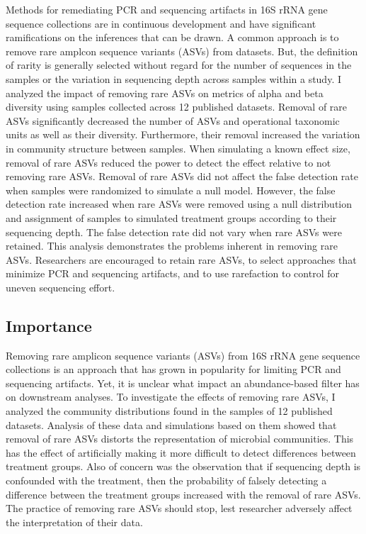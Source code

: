 \documentclass[
]{article}
\begin{document}
Methods for remediating PCR and sequencing artifacts in 16S rRNA gene
sequence collections are in continuous development and have significant
ramifications on the inferences that can be drawn. A common approach is
to remove rare amplcon sequence variants (ASVs) from datasets. But, the
definition of rarity is generally selected without regard for the number
of sequences in the samples or the variation in sequencing depth across
samples within a study. I analyzed the impact of removing rare ASVs on
metrics of alpha and beta diversity using samples collected across 12
published datasets. Removal of rare ASVs significantly decreased the
number of ASVs and operational taxonomic units as well as their
diversity. Furthermore, their removal increased the variation in
community structure between samples. When simulating a known effect
size, removal of rare ASVs reduced the power to detect the effect
relative to not removing rare ASVs. Removal of rare ASVs did not affect
the false detection rate when samples were randomized to simulate a null
model. However, the false detection rate increased when rare ASVs were
removed using a null distribution and assignment of samples to simulated
treatment groups according to their sequencing depth. The false
detection rate did not vary when rare ASVs were retained. This analysis
demonstrates the problems inherent in removing rare ASVs. Researchers
are encouraged to retain rare ASVs, to select approaches that minimize
PCR and sequencing artifacts, and to use rarefaction to control for
uneven sequencing effort.

\newpage

\hypertarget{importance}{%
\subsection{Importance}\label{importance}}

Removing rare amplicon sequence variants (ASVs) from 16S rRNA gene
sequence collections is an approach that has grown in popularity for
limiting PCR and sequencing artifacts. Yet, it is unclear what impact an
abundance-based filter has on downstream analyses. To investigate the
effects of removing rare ASVs, I analyzed the community distributions
found in the samples of 12 published datasets. Analysis of these data
and simulations based on them showed that removal of rare ASVs distorts
the representation of microbial communities. This has the effect of
artificially making it more difficult to detect differences between
treatment groups. Also of concern was the observation that if sequencing
depth is confounded with the treatment, then the probability of falsely
detecting a difference between the treatment groups increased with the
removal of rare ASVs. The practice of removing rare ASVs should stop,
lest researcher adversely affect the interpretation of their data.
\end{document}
